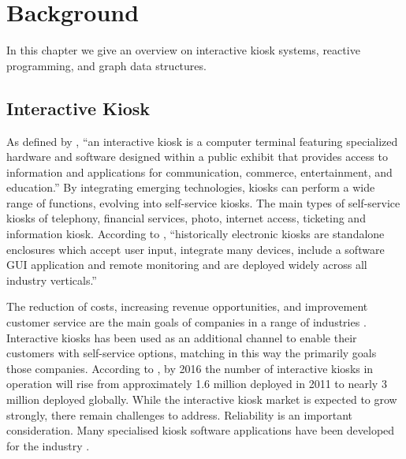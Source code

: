 \chapter{Background}
\label{sec:back}



In this chapter we give an overview on interactive kiosk systems, reactive programming, and graph data structures.

\section{Interactive Kiosk}


As defined by \cite{satish2012money}, ``an interactive kiosk is a computer terminal featuring specialized hardware and software designed within a public exhibit that provides access to information and applications for communication, commerce, entertainment, and education.''
By integrating emerging technologies, kiosks can perform a wide range of functions, evolving into self-service kiosks.
The main types of self-service kiosks of telephony, financial services, photo, internet access, ticketing and information kiosk.
According to \cite{kelsen2012unleashing}, ``historically electronic kiosks are standalone enclosures which accept user input, integrate many devices, include a software GUI application and remote monitoring and are deployed widely across all industry verticals.'' 

The reduction of costs, increasing revenue opportunities, and improvement customer service are the main goals of companies in a range of industries \cite{rigby2015management}.
Interactive kiosks has been used as an additional channel to enable their customers with self-service options, matching in this way the primarily goals those companies. 
According to \cite{abi16}, by 2016 the number of interactive kiosks in operation will rise from approximately 1.6 million deployed in 2011 to nearly 3 million deployed globally.
While the interactive kiosk market is expected to grow strongly, there remain challenges to address.
Reliability is an important consideration.
Many specialised kiosk software applications have been developed for the industry \cite{kelsen2012unleashing}. 




